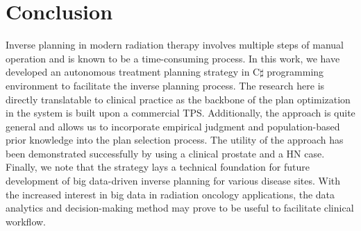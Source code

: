 \section{Conclusion}

Inverse planning in modern radiation therapy involves multiple steps of manual operation and is known to be a time-consuming process. In this work, we have developed an autonomous treatment planning strategy in C$\sharp$ programming environment to facilitate the inverse planning process. The research here is directly translatable to clinical practice as the backbone of the plan optimization in the system is built upon a commercial TPS. Additionally, the approach is quite general and allows us to incorporate empirical judgment and population-based prior knowledge into the plan selection process.  The utility of the approach has been demonstrated successfully by using a clinical prostate and a HN case. Finally, we note that the strategy lays a technical foundation for future development of big data-driven inverse planning for various disease sites. With the increased interest in big data in radiation oncology applications, the data analytics and decision-making method may prove to be useful to facilitate clinical workflow.  

